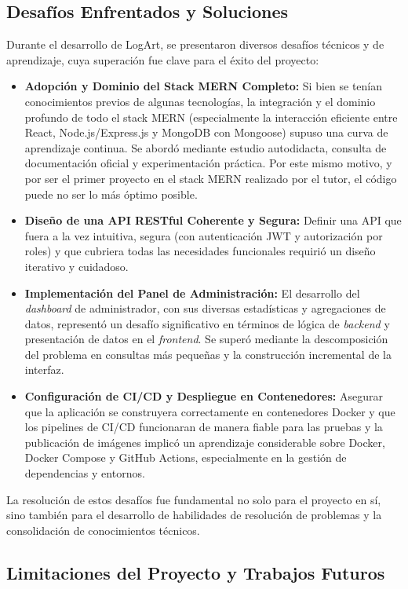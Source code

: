 \subsection{Desafíos Enfrentados y Soluciones}
\label{ssec:desafiosSoluciones}

Durante el desarrollo de LogArt, se presentaron diversos desafíos técnicos y de aprendizaje, cuya superación fue clave para el éxito del proyecto:
\begin{itemize}
    \item \textbf{Adopción y Dominio del Stack MERN Completo:} Si bien se tenían conocimientos previos de algunas tecnologías, la integración y el dominio profundo de todo el stack MERN (especialmente la interacción eficiente entre React, Node.js/Express.js y MongoDB con Mongoose) supuso una curva de aprendizaje continua. Se abordó mediante estudio autodidacta, consulta de documentación oficial y experimentación práctica. Por este mismo motivo, y por ser el primer proyecto en el stack MERN realizado por el tutor, el código puede no ser lo más óptimo posible.
    \item \textbf{Diseño de una API RESTful Coherente y Segura:} Definir una API que fuera a la vez intuitiva, segura (con autenticación JWT y autorización por roles) y que cubriera todas las necesidades funcionales requirió un diseño iterativo y cuidadoso.
    \item \textbf{Implementación del Panel de Administración:} El desarrollo del \textit{dashboard} de administrador, con sus diversas estadísticas y agregaciones de datos, representó un desafío significativo en términos de lógica de \textit{backend} y presentación de datos en el \textit{frontend}. Se superó mediante la descomposición del problema en consultas más pequeñas y la construcción incremental de la interfaz.
    \item \textbf{Configuración de CI/CD y Despliegue en Contenedores:} Asegurar que la aplicación se construyera correctamente en contenedores Docker y que los pipelines de CI/CD funcionaran de manera fiable para las pruebas y la publicación de imágenes implicó un aprendizaje considerable sobre Docker, Docker Compose y GitHub Actions, especialmente en la gestión de dependencias y entornos.
\end{itemize}
La resolución de estos desafíos fue fundamental no solo para el proyecto en sí, sino también para el desarrollo de habilidades de resolución de problemas y la consolidación de conocimientos técnicos.

\subsection{Limitaciones del Proyecto y Trabajos Futuros}
\label{ssec:limitacionesproyecto}

